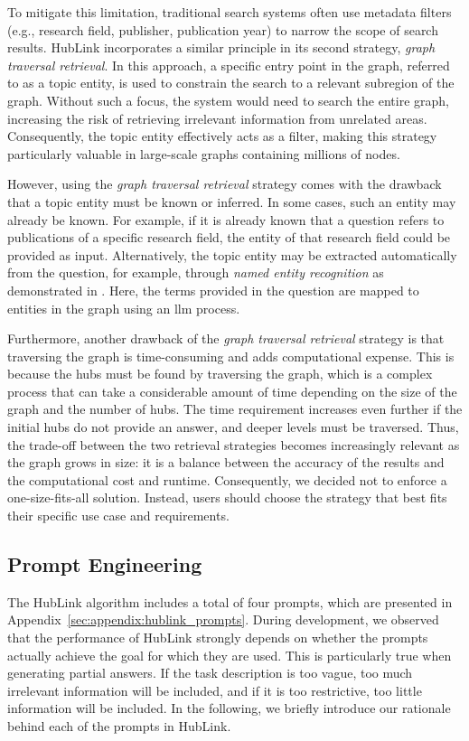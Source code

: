 To mitigate this limitation, traditional search systems often use metadata filters (e.g., research field, publisher, publication year) to narrow the scope of search results. HubLink incorporates a similar principle in its second strategy, \emph{graph traversal retrieval}. In this approach, a specific entry point in the graph, referred to as a topic entity, is used to constrain the search to a relevant subregion of the graph. Without such a focus, the system would need to search the entire graph, increasing the risk of retrieving irrelevant information from unrelated areas. Consequently, the topic entity effectively acts as a filter, making this strategy particularly valuable in large-scale graphs containing millions of nodes.

However, using the \emph{graph traversal retrieval} strategy comes with the drawback that a topic entity must be known or inferred. In some cases, such an entity may already be known. For example, if it is already known that a question refers to publications of a specific research field, the entity of that research field could be provided as input. Alternatively, the topic entity may be extracted automatically from the question, for example, through \emph{named entity recognition} as demonstrated in \cite{wang_reasoning_2024}. Here, the terms provided in the question are mapped to entities in the graph using an \gls{llm} process. 

Furthermore, another drawback of the \emph{graph traversal retrieval} strategy is that traversing the graph is time-consuming and adds computational expense. This is because the hubs must be found by traversing the graph, which is a complex process that can take a considerable amount of time depending on the size of the graph and the number of hubs. The time requirement increases even further if the initial hubs do not provide an answer, and deeper levels must be traversed. Thus, the trade-off between the two retrieval strategies becomes increasingly relevant as the graph grows in size: it is a balance between the accuracy of the results and the computational cost and runtime. Consequently, we decided not to enforce a one-size-fits-all solution. Instead, users should choose the strategy that best fits their specific use case and requirements.

\subsection{Prompt Engineering}

The HubLink algorithm includes a total of four prompts, which are presented in Appendix~\ref{sec:appendix:hublink_prompts}. During development, we observed that the performance of HubLink strongly depends on whether the prompts actually achieve the goal for which they are used. This is particularly true when generating partial answers. If the task description is too vague, too much irrelevant information will be included, and if it is too restrictive, too little information will be included. In the following, we briefly introduce our rationale behind each of the prompts in HubLink.

